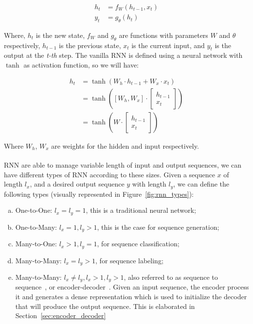 \begin{equation}
\begin{split}
    h_t & = f_W(h_{t-1}, x_t) \\
    y_t & = g_{\theta}(h_t)
\end{split}
\label{eq:generic_rnn}
\end{equation}

Where, $h_t$ is the new state, $f_W$ and $g_\theta$ are functions with parameters $W$ and $\theta$ respectively, $h_{t-1}$ is the previous state, $x_t$ is the current input, and $y_t$ is the output at the \textit{t-th} step.
The vanilla RNN is defined using a neural network with $\tanh$ as activation function, so we will have:

\begin{equation}
\begin{split}
    h_t & = \tanh\left(W_h \cdot h_{t-1} + W_x \cdot x_t\right)\\
        & = \tanh\left([W_h, W_x] \cdot \begin{bmatrix}
           h_{t-1} \\
           x_t
         \end{bmatrix}\right)\\
         & = \tanh\left(W \cdot \begin{bmatrix}
           h_{t-1} \\
           x_t
         \end{bmatrix}\right)
\end{split}
\end{equation}

Where $W_h$, $W_x$ are weights for the hidden and input respectively. 

\paragraph{}
RNN are able to manage variable length of input and output sequences, we can have different types of RNN according to these sizes. Given a sequence $x$ of length $l_x$, and a desired output sequence $y$ with length $l_y$, we can define the following types (visually represented in Figure~\ref{fig:rnn_types}):

\begin{enumerate}[a), noitemsep]
    \item One-to-One: $l_x = l_y = 1$, this is a traditional neural network;
    \item One-to-Many: $l_x = 1, l_y > 1$, this is the case for sequence generation;
    \item Many-to-One: $l_x > 1, l_y = 1$, for sequence classification;
    \item Many-to-Many: $l_x = l_y > 1$, for sequence labeling;
    \item Many-to-Many: $l_x \neq l_y, l_x > 1, l_y > 1$, also referred to as sequence to sequence~\citep{sutskever2014sequence}, or encoder-decoder~\citep{cho-etal-2014-learning}. Given an input sequence, the encoder process it and generates a dense representation which is used to initialize the decoder that will produce the output sequence. This is elaborated in Section~\ref{sec:encoder_decoder}
\end{enumerate}

